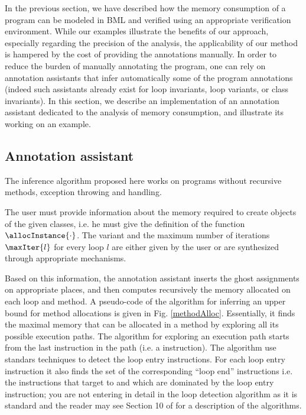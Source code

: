 In the previous section, we have described how the memory consumption
of a program can be modeled in BML and verified using an appropriate
verification environment. While our examples illustrate the benefits
of our approach, especially regarding the precision of the analysis,
the applicability of our method is hampered by the cost of providing
the annotations manually. In order to reduce the burden of manually
annotating the program, one can rely on annotation assistants that
infer automatically some of the program annotations (indeed such
assistants already exist for loop invariants, loop variants, or
class invariants). In this section, we describe an implementation of
an annotation assistant dedicated to the analysis of memory consumption,
and illustrate its working on an example.

\subsection{Annotation assistant}
The inference algorithm proposed here works on programs
 without recursive methods, exception throwing and handling.  


The user must provide information about the memory required to create objects of the given classes,
 i.e. he must give the definition  of the function $\allocInstance{\cdot}$.
 The variant and the maximum number of iterations $\maxIter{l}$ for every loop $l$  are either given by the
 user or are synthesized  through appropriate mechanisms. 


Based on this information, the annotation assistant 
inserts the ghost assignments on appropriate places, and then computes
recursively the memory allocated on each loop and method. 
A pseudo-code of the algorithm for inferring an upper bound for method allocations is given in Fig. \ref{methodAlloc}.
Essentially, it finds the maximal memory that can be allocated in a method by exploring all its possible execution paths.  
The algorithm for exploring an execution path starts from the last instruction in the path (i.e. a \return{} instruction). 
The algorithm use standars techniques to detect the loop entry instructions. For each loop entry instruction it also finds  
the set  of the corresponding ``loop end'' instructions i.e. the  instructions  that target   to  and which are dominated by
the loop entry instruction; you are not entering in detail in the loop detection
algorithm as it is standard and the reader may  see Section 10 of 
 \cite{ASU86cpt} for a description of the algorithms.



